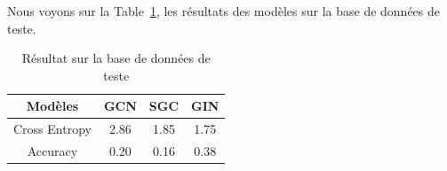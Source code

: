\documentclass[a4paper]{article}
\begin{document}
Nous voyons sur la Table~\ref{tab:test}, les résultats des modèles sur la base de données de teste.

\begin{table}
    \centering
    \begin{tabular}{|c|c|c|c|}
        \hline
        Modèles & GCN & SGC & GIN \\
        \hline
        Cross Entropy & 2.86 & 1.85 & 1.75 \\
        \hline
        Accuracy & 0.20 & 0.16 & 0.38\\
        \hline
    \end{tabular}
    \caption{Résultat sur la base de données de teste}
    \label{tab:test}
\end{table}

\newpage
\printbibliography
\end{document}
